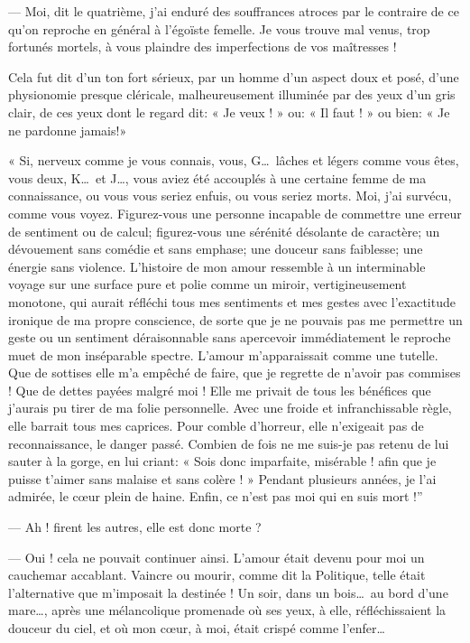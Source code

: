 --- Moi, dit le quatrième, j’ai enduré des souffrances
atroces par le contraire de ce qu’on reproche en
général à l’égoïste femelle. Je vous trouve mal venus,
trop fortunés mortels, à vous plaindre des imperfections de vos
maîtresses !

Cela fut dit d’un ton fort sérieux, par un homme
d’un aspect doux et posé, d’une
physionomie presque cléricale, malheureusement illuminée par des yeux
d’un gris clair, de ces yeux dont le regard dit: « Je
veux ! » ou: « Il faut ! » ou bien: « Je ne pardonne jamais!»

« Si, nerveux comme je vous connais, vous, G\ldots\ lâches et légers comme
vous êtes, vous deux, K\ldots\ et J\ldots, vous aviez été accouplés à une
certaine femme de ma connaissance, ou vous vous seriez enfuis, ou vous
seriez morts. Moi, j’ai survécu, comme vous voyez.
Figurez{}-vous une personne incapable de commettre une erreur de
sentiment ou de calcul; figurez{}-vous une sérénité désolante de
caractère; un dévouement sans comédie et sans emphase; une douceur sans
faiblesse; une énergie sans violence. L’histoire de
mon amour ressemble à un interminable voyage sur une surface pure et
polie comme un miroir, vertigineusement monotone, qui aurait réfléchi
tous mes sentiments et mes gestes avec l’exactitude
ironique de ma propre conscience, de sorte que je ne pouvais pas me
permettre un geste ou un sentiment déraisonnable sans apercevoir
immédiatement le reproche muet de mon inséparable spectre.
L’amour m’apparaissait comme une
tutelle. Que de sottises elle m’a empêché de faire,
que je regrette de n’avoir pas commises ! Que de
dettes payées malgré moi ! Elle me privait de tous les bénéfices que
j’aurais pu tirer de ma folie personnelle. Avec une
froide et infranchissable règle, elle barrait tous mes caprices. Pour
comble d’horreur, elle n’exigeait pas
de reconnaissance, le danger passé. Combien de fois ne me suis{}-je pas
retenu de lui sauter à la gorge, en lui criant: « Sois donc imparfaite,
misérable ! afin que je puisse t’aimer sans malaise et
sans colère ! » Pendant plusieurs années, je l’ai
admirée, le c\oe ur plein de haine. Enfin, ce n’est pas
moi qui en suis mort !''

--- Ah ! firent les autres, elle est donc morte ?

--- Oui ! cela ne pouvait continuer ainsi. L’amour était
devenu pour moi un cauchemar accablant. Vaincre ou mourir, comme dit la
Politique, telle était l’alternative que
m’imposait la destinée ! Un soir, dans un bois\ldots\ au
bord d’une mare\ldots, après une mélancolique promenade
où ses yeux, à elle, réfléchissaient la douceur du ciel, et où mon
c\oe ur, à moi, était crispé comme l’enfer\ldots

